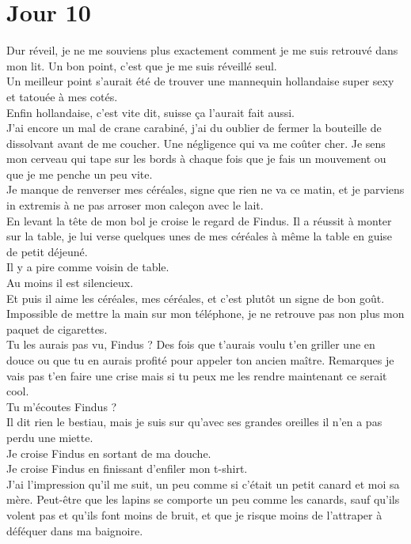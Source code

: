 \chapter*{Jour 10}
Dur réveil, je ne me souviens plus exactement comment je me suis retrouvé dans mon lit. Un bon point, c'est que je me suis réveillé seul. \\

Un meilleur point s'aurait été de trouver une mannequin hollandaise super sexy et tatouée à mes cotés. \\
Enfin hollandaise, c'est vite dit, suisse ça l'aurait fait aussi. \\

J'ai encore un mal de crane carabiné, j'ai du oublier de fermer la bouteille de dissolvant avant de me coucher. Une négligence qui va me coûter cher. Je sens mon cerveau qui tape sur les bords à chaque fois que je fais un mouvement ou que je me penche un peu vite.\\

Je manque de renverser mes céréales, signe que rien ne va ce matin, et je parviens in extremis à ne pas arroser mon caleçon avec le lait. \\
En levant la tête de mon bol je croise le regard de Findus. Il a réussit à monter sur la table, je lui verse quelques unes de mes céréales à même la table en guise de petit déjeuné. \\

Il y a pire comme voisin de table. \\
Au moins il est silencieux. \\
Et puis il aime les céréales, mes céréales, et c'est plutôt un signe de bon goût. \\

Impossible de mettre la main sur mon téléphone, je ne retrouve pas non plus mon paquet de cigarettes. \\
Tu les aurais pas vu, Findus ? Des fois que t'aurais voulu t'en griller une en douce ou que tu en aurais profité pour appeler ton ancien maître. Remarques je vais pas t'en faire une crise mais si tu peux me les rendre maintenant ce serait cool. \\
Tu m'écoutes Findus ?\\
Il dit rien le bestiau, mais je suis sur qu'avec ses grandes oreilles il n'en a pas perdu une miette. \\

Je croise Findus en sortant de ma douche. \\
Je croise Findus en finissant d'enfiler mon t-shirt. \\
J'ai l'impression qu'il me suit, un peu comme si c'était un petit canard et moi sa mère. Peut-être que les lapins se comporte un peu comme les canards, sauf qu'ils volent pas et qu'ils font moins de bruit, et que je risque moins de l'attraper à déféquer dans ma baignoire. \\